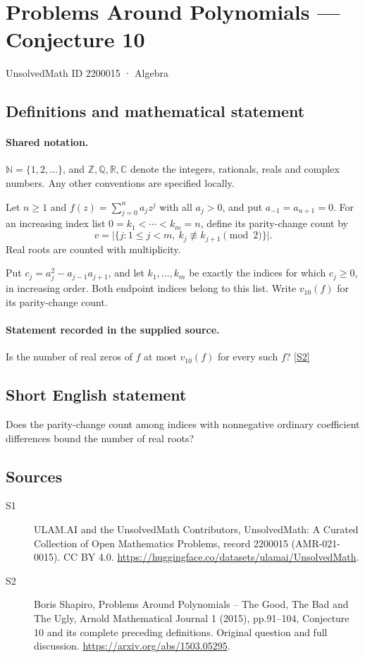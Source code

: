 \documentclass[11pt]{article}
\newcommand{\sref}[2]{\hyperlink{source:#1:#2}{[S#2]}}
\begin{document}
\setcounter{section}{2200014}
\section{Problems Around Polynomials — Conjecture 10}\label{2200015}
{\small\sffamily UnsolvedMath ID 2200015 · Algebra}
\subsection{Definitions and mathematical statement}

\paragraph{Shared notation.}$\mathbb N=\{1,2,\ldots\}$, and $\mathbb Z,\mathbb Q,\mathbb R,\mathbb C$ denote the integers, rationals, reals and complex numbers. Any other conventions are specified locally.


Let $n\geq1$ and $f(z)=\sum_{j=0}^n a_jz^j$ with all $a_j>0$, and put $a_{-1}=a_{n+1}=0$. For an increasing index list $0=k_1<\cdots<k_m=n$, define its parity-change count by
\[v=\bigl|\{j:1\leq j<m,\ k_j\not\equiv k_{j+1}\pmod2\}\bigr|.\]
Real roots are counted with multiplicity.\par Put $c_j=a_j^2-a_{j-1}a_{j+1}$, and let $k_1,\ldots,k_m$ be exactly the indices for which $c_j\geq0$, in increasing order. Both endpoint indices belong to this list. Write $v_{10}(f)$ for its parity-change count.
\paragraph{Statement recorded in the supplied source.}
Is the number of real zeros of $f$ at most $v_{10}(f)$ for every such $f$? \sref{2200015}{2}
\subsection{Short English statement}
Does the parity-change count among indices with nonnegative ordinary coefficient differences bound the number of real roots?
\subsection{Sources}
\begin{description}
\item[\hypertarget{source:2200015:1}{S1}] ULAM.AI and the UnsolvedMath Contributors, UnsolvedMath: A Curated Collection of Open Mathematics Problems, record 2200015 (AMR-021-0015). CC BY 4.0. \url{https://huggingface.co/datasets/ulamai/UnsolvedMath}.
\item[\hypertarget{source:2200015:2}{S2}] Boris Shapiro, Problems Around Polynomials -- The Good, The Bad and The Ugly, Arnold Mathematical Journal 1 (2015), pp.91--104, Conjecture 10 and its complete preceding definitions. Original question and full discussion. \url{https://arxiv.org/abs/1503.05295}.

\end{description}
\label{end:2200015}
\end{document}
